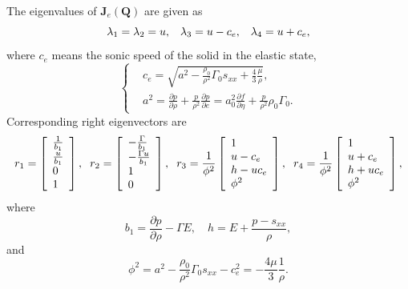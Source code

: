 \documentclass{article}
\numberwithin{equation}{section}
\numberwithin{table}{section}
\begin{document}
The eigenvalues of $\mathbf{J}_{e}(\mathbf{Q})$ are given as
\begin{equation*}
  \lambda_1 =\lambda_2 = u, \hspace{0.3cm} \lambda_3 = u-c_{e}, \hspace{0.3cm} \lambda_4 = u+c_{e},
\end{equation*}
where $c_e$ means the sonic speed of the solid in the elastic state,
\begin{equation}\label{eq:c_e}
  \left\{ \begin{aligned}
      & c_e = \sqrt{a^2-\frac{\rho_0}{\rho^2}\Gamma_0 s_{xx} +\frac{4}{3}\frac{\mu}{\rho}},\\
    &   a^2 = \frac{\partial p}{\partial \rho} + \frac{p}{\rho^2}\frac{\partial p}{\partial e} = a^2_0 \frac{\partial f}{\partial \eta} + \frac{p}{\rho^2}\rho_0 \Gamma_0.
      \end{aligned} \right.
    \end{equation}
 Corresponding right eigenvectors are
\begin{equation}\label{eq:eiv}
  r_1 = \left[ \begin{array}{l}
      \frac{1}{b_1} \\
      \frac{u}{b_1} \\
      0 \\
      1 \\
    \end{array}
    \right], \hspace{0.2cm}
    r_2= \left[ \begin{array}{l}
        -\frac{\Gamma}{b_1} \\
        -\frac{\Gamma u}{b_1} \\
        1 \\
        0\\
      \end{array}
    \right], \hspace{0.2cm}
r_3 =   \frac{1}{\phi^2}\left[\begin{array}{l}
        1 \\
        u-c_e \\
        h -uc_e \\
        \phi^2
      \end{array}
    \right], \hspace{0.2cm}
r_4 = \frac{1}{\phi^2}\left[\begin{array}{l}
        1 \\
        u+c_e \\
        h +uc_e \\
        \phi^2
      \end{array}
    \right],
  \end{equation}
  where
  \begin{equation*}
    b_1 = \frac{\partial p}{\partial \rho} - \Gamma E,  \quad h = E +\frac{p-s_{xx}}{\rho},
  \end{equation*}
  and
  \begin{equation*}
    \phi^2 = a^2 -\frac{\rho_0}{\rho^2} \Gamma_0 s_{xx}-c_e^2 = -\frac{4\mu}{3}\frac{1}{\rho}.
  \end{equation*}
\end{document}
